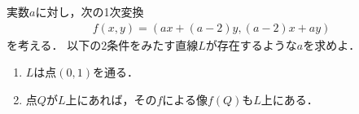 \documentclass[../../main.tex]{subfiles}
\begin{document}
実数$a$に対し，次の1次変換
\begin{align}
  f(x,y)=(ax+(a-2)y,(a-2)x+ay)
\end{align}
を考える．
以下の2条件をみたす直線$L$が存在するような$a$を求めよ．
\begin{enumerate}
  \item $L$は点$(0,1)$を通る．
  \item 点$Q$が$L$上にあれば，その$f$による像$f(Q)$も$L$上にある．
\end{enumerate}
\end{document}
